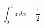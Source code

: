 \documentclass{article}
\begin{document}
\begin{equation*}
  \int_0^1x dx = \frac{1}{2}
\end{equation*}
\end{document}
